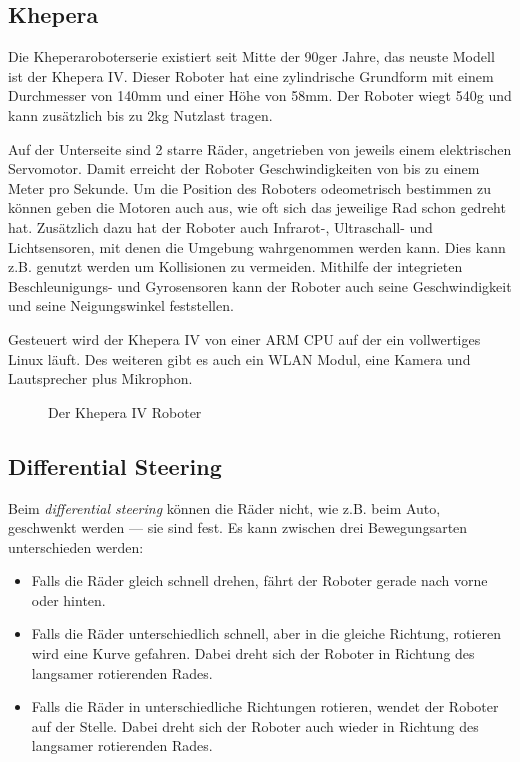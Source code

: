 \subsection{Khepera}\label{khepera}
Die Kheperaroboterserie existiert seit Mitte der 90ger Jahre, das neuste Modell ist der Khepera IV. Dieser Roboter hat eine zylindrische Grundform mit einem Durchmesser von 140mm und einer
H{\"{o}}he von 58mm. Der Roboter wiegt 540g und kann zus{\"{a}}tzlich bis zu 2kg Nutzlast tragen.

Auf der Unterseite sind 2 starre R{\"{a}}der, angetrieben von jeweils einem elektrischen Servomotor. Damit erreicht der Roboter Geschwindigkeiten von bis zu einem Meter pro Sekunde.
Um die Position des Roboters odeometrisch bestimmen zu k{\"{o}}nnen geben die Motoren auch aus, wie oft sich das jeweilige Rad schon gedreht hat. Zus{\"{a}}tzlich dazu hat der Roboter
auch Infrarot-, Ultraschall- und Lichtsensoren, mit denen die Umgebung wahrgenommen werden kann. Dies kann z.B. genutzt werden um Kollisionen zu vermeiden.
Mithilfe der integrieten Beschleunigungs- und Gyrosensoren kann der Roboter auch seine Geschwindigkeit und seine Neigungswinkel feststellen.

Gesteuert wird der Khepera IV von einer ARM CPU auf der ein vollwertiges Linux l{\"{a}}uft. Des weiteren gibt es auch ein WLAN Modul, eine Kamera und Lautsprecher plus Mikrophon.

\begin{figure}
	\centering
	\caption{Der Khepera IV Roboter}
	\label{fig:kheperaiv}
\end{figure}

\subsection{Differential Steering}\label{diffs}
Beim \textit{differential steering} k{\"{o}}nnen die R{\"{a}}der nicht, wie z.B. beim Auto, geschwenkt werden --- sie sind fest. Es kann zwischen drei Bewegungsarten unterschieden werden:
\begin{itemize}
\item Falls die R{\"{a}}der gleich schnell drehen, f{\"{a}}hrt der Roboter gerade nach vorne oder hinten.
\item Falls die R{\"{a}}der unterschiedlich schnell, aber in die gleiche Richtung, rotieren wird eine Kurve gefahren. Dabei dreht sich der Roboter in Richtung des langsamer rotierenden Rades.
\item Falls die R{\"{a}}der in unterschiedliche Richtungen rotieren, wendet der Roboter auf der Stelle. Dabei dreht sich der Roboter auch wieder in Richtung des langsamer rotierenden Rades.
\end{itemize}

